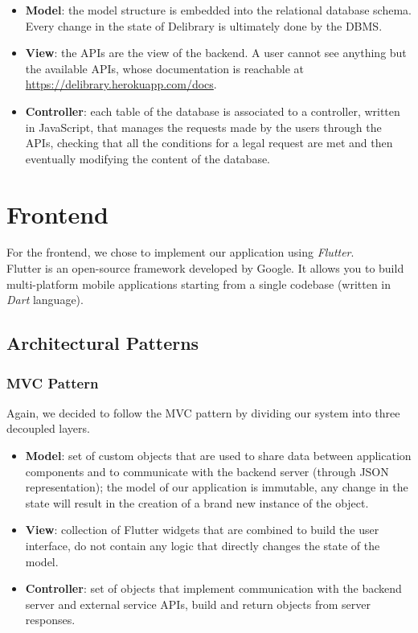 \begin{itemize}
      \item \textbf{Model}:
            the model structure is embedded into the relational database schema.
            Every change in the state of Delibrary is ultimately done by the DBMS.
      \item \textbf{View}:
            the APIs are the view of the backend. A user cannot see anything but the available APIs, whose documentation is reachable at \href{https://delibrary.herokuapp.com/docs/}{https://delibrary.herokuapp.com/docs}.
      \item \textbf{Controller}:
            each table of the database is associated to a controller, written in JavaScript, that manages the requests made by the users through the APIs, checking that all the conditions for a legal request are met and then eventually modifying the content of the database.
\end{itemize}


\section{Frontend}
For the frontend, we chose to implement our application using \emph{Flutter}.\\
Flutter is an open-source framework developed by Google.
It allows you to build multi-platform mobile applications starting from a single codebase (written in \emph{Dart} language).

\subsection{Architectural Patterns}

\subsubsection{MVC Pattern}
Again, we decided to follow the MVC pattern by dividing our system into three decoupled layers.
\begin{itemize}
      \item \textbf{Model}:
            set of custom objects that are used to share data between application components and to communicate with the backend server (through JSON representation);
            the model of our application is immutable, any change in the state will result in the creation of a brand new instance of the object.
      \item \textbf{View}:
            collection of Flutter widgets that are combined to build the user interface, do not contain any logic that directly changes the state of the model.
      \item \textbf{Controller}:
            set of objects that implement communication with the backend server and external service APIs, build and return objects from server responses.
\end{itemize}

